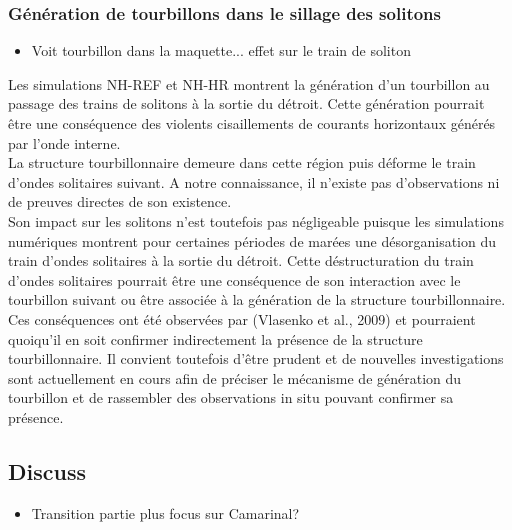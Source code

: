 \subsubsection{Génération de tourbillons dans le sillage des solitons}

\begin{itemize}
\item Voit tourbillon dans la maquette... effet sur le train de soliton
\end{itemize}


Les simulations NH-REF et NH-HR montrent la génération d'un tourbillon au passage des trains de solitons à la sortie du détroit. Cette génération pourrait être une conséquence des violents cisaillements de courants horizontaux générés par l'onde interne.\\
La structure tourbillonnaire demeure dans cette région puis déforme le train d'ondes solitaires suivant. A notre connaissance, il n'existe pas d'observations ni de preuves directes de son existence.\\
Son impact sur les solitons n'est toutefois pas négligeable puisque les simulations numériques montrent pour certaines périodes de marées une désorganisation du train d'ondes solitaires à la sortie du détroit. Cette déstructuration du train d'ondes solitaires pourrait être une conséquence de son interaction avec le tourbillon suivant ou être associée à la génération de la structure tourbillonnaire. Ces conséquences ont été observées par (Vlasenko et al., 2009) et pourraient quoiqu'il en soit confirmer indirectement la présence de la structure tourbillonnaire. Il convient toutefois d'être prudent et de nouvelles investigations sont actuellement en cours afin de préciser le mécanisme de génération du tourbillon et de rassembler des observations in situ pouvant confirmer sa présence.




\subsection{Discuss}

\begin{itemize}
\item Transition partie plus focus sur Camarinal?
\end{itemize}


